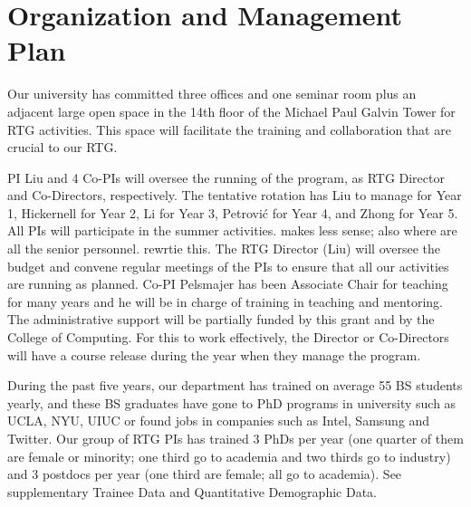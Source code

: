 \documentclass[11pt]{NSFamsart}
\begin{document}
\section{Organization and Management Plan }
 
 \iffalse
 Provide evidence of past success in training undergraduates, graduate students, and postdocs, identifying names, degree dates, and subsequent placement (including the flow of undergraduates into graduate programs). Applicants may refer to Trainee Data in supplemental documents, if included. Describe the plans, procedures, and personnel for the development and monitoring of all aspects of the project. In particular, discuss plans to ensure appropriate mentoring of students and postdoctoral associates, as well as the roles of the faculty involved. Provide evidence of faculty commitment necessary for the implementation of the proposed program. If the project involves international collaborations, industrial internships, or arrangements with government laboratories, businesses, or other departments, then the proposal should document existing arrangements, any plans for expanding these arrangements, and the personnel involved in managing these linkages.  
 \fi
 
Our university has committed three offices and one seminar room plus an adjacent large open space in the 14th floor of the Michael Paul Galvin Tower for RTG activities. This space will facilitate the training and collaboration that are crucial to our RTG.
 
PI Liu and 4 Co-PIs will oversee the running of the program, as RTG Director  and Co-Directors, respectively.  The tentative rotation has Liu to manage for Year 1, Hickernell for Year 2,    Li for  Year 3, Petrovi\'{c} for Year 4,     and Zhong for Year 5.   All PIs will participate in the summer activities.  
{\color{magenta} makes less sense; also where are all the senior personnel. rewrtie this.} 
The RTG Director (Liu) will oversee the budget and convene regular meetings of the PIs to ensure that all our activities are running as planned. Co-PI Pelsmajer has been
Associate Chair for teaching for many years and he will be in charge of  training in teaching and mentoring. 
The administrative support will be partially funded by this grant and by the College of Computing. 
For this to work effectively, the Director or Co-Directors will have a course release during the year when they manage the program.

During the past five years, our department has trained on average 55 BS students yearly, and these BS graduates have gone to PhD programs in university such as UCLA, NYU, UIUC or found jobs in companies such as Intel, Samsung and Twitter. Our group of RTG PIs has trained 3 PhDs per year (one quarter of them are female or minority; one third go to academia and two thirds go to industry)  and 3 postdocs per year (one third are female; all go to academia).  See supplementary Trainee Data and Quantitative Demographic Data. 
\end{document}
